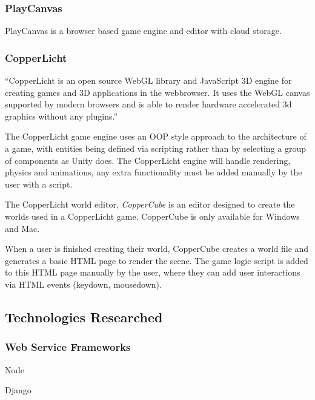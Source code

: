 \documentclass[a4paper, 12pt]{article}
\begin{document}

\subsubsection{PlayCanvas}
PlayCanvas is a browser based game engine and editor with cloud storage. 


\subsubsection{CopperLicht}
``CopperLicht is an open source WebGL library and JavaScript 3D engine for creating games and 3D applications in the webbrowser. It uses the WebGL canvas supported by modern browsers and is able to render hardware accelerated 3d graphics without any plugins.''


The CopperLicht game engine uses an OOP style approach to the architecture of a game, with entities being defined via scripting rather than by selecting a group of components as Unity does. The CopperLicht engine will handle rendering, physics and animations, any extra functionality must be added manually by the user with a script.


The CopperLicht world editor, \emph{CopperCube} is an editor designed to create the worlds used in a CopperLicht game. CopperCube is only available for Windows and Mac.


When a user is finished creating their world, CopperCube creates a world file and generates a basic HTML page to render the scene. The game logic script is added to this HTML page manually by the user, where they can add user interactions via HTML events (keydown, mousedown).



\subsection{Technologies Researched}
\subsubsection{Web Service Frameworks}
Node

Django
\end{document}
